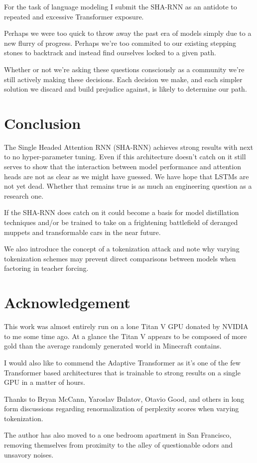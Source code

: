 \documentclass{article}
\begin{document}
For the task of language modeling I submit the SHA-RNN as an antidote to repeated and excessive Transformer exposure.

Perhaps we were too quick to throw away the past era of models simply due to a new flurry of progress.
Perhaps we're too commited to our existing stepping stones to backtrack and instead find ourselves locked to a given path.

Whether or not we're asking these questions consciously as a community we're still actively making these decisions.
Each decision we make, and each simpler solution we discard and build prejudice against, is likely to determine our path.

\section{Conclusion}

The Single Headed Attention RNN (SHA-RNN)
achieves strong results with next to no hyper-parameter tuning.
Even if this architecture doesn't catch on it still serves to show that the interaction between model performance and attention heads are not as clear as we might have guessed.
We have hope that LSTMs are not yet dead.
Whether that remains true is as much an engineering question as a research one.

If the SHA-RNN does catch on it could become a basis for model distillation techniques and/or be trained to take on a frightening battlefield of deranged muppets and transformable cars in the near future.

We also introduce the concept of a tokenization attack and note why varying tokenization schemes may prevent direct comparisons between models when factoring in teacher forcing.



\section{Acknowledgement}

This work was almost entirely run on a lone Titan V GPU donated by NVIDIA to me some time ago.
At a glance the Titan V appears to be composed of more gold than the average randomly generated world in Minecraft contains.

I would also like to commend the Adaptive Transformer \cite{sukhbaatar2019adaptive} as it's one of the few Transformer based architectures that is trainable to strong results on a single GPU in a matter of hours.

Thanks to Bryan McCann, Yaroslav Bulatov, Otavio Good, and others in long form discussions regarding renormalization of perplexity scores when varying tokenization.

The author has also moved to a one bedroom apartment in San Francisco, removing themselves from proximity to the alley of questionable odors and unsavory noises.



\end{document}

